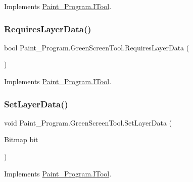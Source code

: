 Implements \mbox{\hyperlink{interface_paint___program_1_1_i_tool_a47984c2879213022f1684c07f7bba73e}{Paint\+\_\+\+Program.\+I\+Tool}}.

\mbox{\label{class_paint___program_1_1_green_screen_tool_a554c35de10b5876aa936961177344a59}} 
\subsubsection{\texorpdfstring{Requires\+Layer\+Data()}{RequiresLayerData()}}
{\footnotesize\ttfamily bool Paint\+\_\+\+Program.\+Green\+Screen\+Tool.\+Requires\+Layer\+Data (\begin{DoxyParamCaption}{ }\end{DoxyParamCaption})\hspace{0.3cm}{\ttfamily [inline]}}



Implements \mbox{\hyperlink{interface_paint___program_1_1_i_tool_a6d45b6c48da8130ae41db3a66cdaef9a}{Paint\+\_\+\+Program.\+I\+Tool}}.

\mbox{\label{class_paint___program_1_1_green_screen_tool_ad17100eea4bbfc96072cf4525ea053c4}} 
\subsubsection{\texorpdfstring{Set\+Layer\+Data()}{SetLayerData()}}
{\footnotesize\ttfamily void Paint\+\_\+\+Program.\+Green\+Screen\+Tool.\+Set\+Layer\+Data (\begin{DoxyParamCaption}\item[{Bitmap}]{bit }\end{DoxyParamCaption})\hspace{0.3cm}{\ttfamily [inline]}}



Implements \mbox{\hyperlink{interface_paint___program_1_1_i_tool_a2d3e63715dfe04075d27dacf367d1633}{Paint\+\_\+\+Program.\+I\+Tool}}.

